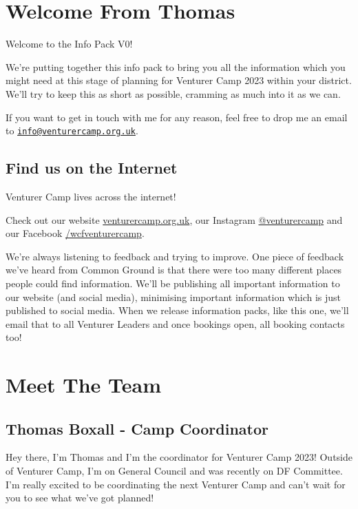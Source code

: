 \documentclass[a4paper, 10pt]{report}
\begin{document}
\tableofcontents

\chapter{Welcome From Thomas}
Welcome to the Info Pack V0!

We're putting together this info pack to bring you all the information which you might need at this stage of planning for Venturer Camp 2023 within your district.
We'll try to keep this as short as possible, cramming as much into it as we can.

If you want to get in touch with me for any reason, feel free to drop me an email to \href{mailto:info@venturercamp.orf.uk}{\texttt{info@venturercamp.org.uk}}. 

\section{Find us on the Internet}
Venturer Camp lives across the internet!

Check out our website \href{https://venturercamp.org.uk}{venturercamp.org.uk}, our Instagram \href{https://www.instagram.com/venturercamp/}{@venturercamp} and our Facebook \href{https://facebook.com/wcfventurercamp}{/wcfventurercamp}.

We're always listening to feedback and trying to improve. One piece of feedback we've heard from Common Ground is that there were too many different places people could find information. We'll be publishing all important information to our website (and social media), minimising important information which is just published to social media. When we release information packs, like this one, we'll email that to all Venturer Leaders and once bookings open, all booking contacts too!


\chapter{Meet The Team}
\section{Thomas Boxall - Camp Coordinator}
Hey there, I'm Thomas and I'm the coordinator for Venturer Camp 2023! Outside of Venturer Camp, I'm on General Council and was recently on DF Committee. I'm really excited to be coordinating the next Venturer Camp and can't wait for you to see what we've got planned!
\end{document}
